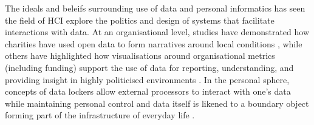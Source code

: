 The ideals and beleifs surrounding use of data and personal informatics has seen the field of HCI explore the politics and design of systems that facilitate interactions with data. At an organisational level, studies have demonstrated how charities have used open data to form narratives around local conditions \cite{erete_storytelling_2016}, while others have highlighted how visualisations around organisational metrics (including funding) support the use of data for reporting, understanding, and providing insight in highly politicised environments \cite{elsden_resviz:_2016}. In the personal sphere, concepts of data lockers allow external processors to interact with one's data while maintaining personal control \cite{mcauley_dataware_2011} and data itself is likened to a boundary object forming part of the infrastructure of everyday life \cite{crabtree_human_2015}.

